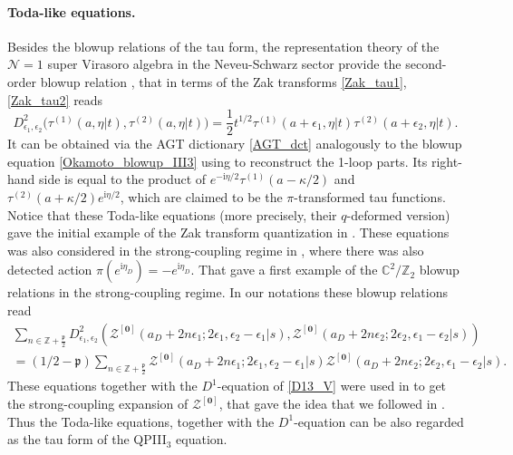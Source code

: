 \documentclass[12pt,a4paper]{article}
\numberwithin{equation}{section}
\newcommand{\ri}{\mathrm{i}}
\newcommand{\D}{\scriptscriptstyle{D}}
\begin{document}
\paragraph{Toda-like equations.}
Besides the blowup relations \cite[(3.1),(3.6)]{BST25} of the tau form, the representation theory of the $\mathcal{N}=1$ super Virasoro algebra in the Neveu-Schwarz sector provide the second-order blowup relation \cite[(4.38)]{BS16b}, that in terms of the Zak transforms \eqref{Zak_tau1}, \eqref{Zak_tau2} reads 
\begin{equation}
D^2_{\epsilon_1,\epsilon_2}\big(\tau^{(1)}(a,\eta|t),\tau^{(2)}(a,\eta|t)\big)=\frac12t^{1/2}\tau^{(1)}(a+\epsilon_1,\eta|t)\tau^{(2)}(a+\epsilon_2,\eta|t).
\end{equation}
It can be obtained via the AGT dictionary \eqref{AGT_dct} analogously to the blowup equation \eqref{Okamoto_blowup_III3} using \cite[(4.31)]{BS16b} to reconstruct the 1-loop parts. 
Its right-hand side is equal to the product of $e^{-\ri\eta/2}\tau^{(1)}(a-\kappa/2)$ and $\tau^{(2)}(a+\kappa/2)e^{\ri\eta/2}$, which are claimed to be the $\pi$-transformed tau functions. Notice that these Toda-like equations (more precisely, their $q$-deformed version) gave the initial example of the Zak transform quantization in \cite[Sec. 4]{BGM17}. These equations was also considered in the strong-coupling regime in \cite[Sec. 7]{GMS20}, where there was also detected action $\pi(e^{\ri\eta_{\D}})=-e^{\ri\eta_{\D}}$. That gave a first example of the $\mathbb{C}^2/\mathbb{Z}_2$ blowup relations in the strong-coupling regime. In our notations these blowup relations \cite[(7.18)]{GMS20} read
\begin{multline}\label{blowup_Toda_strong}
\sum_{n\in\mathbb{Z}+\frac{\mathfrak{p}}2}D^2_{\epsilon_1,\epsilon_2}\left(\mathcal{Z}^{[\mathbf{0}]}(a_{\D}+2n\epsilon_1;2\epsilon_1,\epsilon_2{-}\epsilon_1|s),\mathcal{Z}^{[\mathbf{0}]}(a_{\D}+2n\epsilon_2;2\epsilon_2,\epsilon_1{-}\epsilon_2|s)\right)\\=(1/2-\mathfrak{p})\sum_{n\in\mathbb{Z}+\frac{\mathfrak{p}}2}\mathcal{Z}^{[\mathbf{0}]}(a_{\D}+2n\epsilon_1;2\epsilon_1,\epsilon_2{-}\epsilon_1|s)\mathcal{Z}^{[\mathbf{0}]}(a_{\D}+2n\epsilon_2;2\epsilon_2,\epsilon_1{-}\epsilon_2|s).
\end{multline}
These equations together with the $D^1$-equation of \eqref{D13_V} were used in \cite[Sec. 7.2]{GMS20} to get the strong-coupling expansion of $\mathcal{Z}^{[\mathbf{0}]}$, that gave the idea that we followed in \cite{BST25}. Thus the Toda-like equations, together with the $D^1$-equation can be also regarded as the tau form of the QPIII$_3$ equation. 
\end{document}
